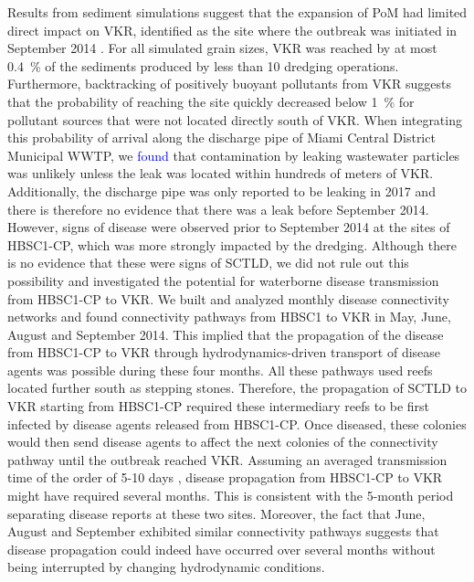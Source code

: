 \documentclass[preprint,12pt,authoryear]{elsarticle}
\newcommand{\modif}[1]{\textcolor{blue}{#1}}
\begin{document}
Results from sediment simulations suggest that the expansion of PoM had limited direct impact on VKR, identified as the site where the outbreak was initiated in September 2014 \citep{precht2016unprecedented}. For all simulated grain sizes, VKR was reached by at most 0.4~\% of the sediments produced by less than 10 dredging operations. Furthermore, backtracking of positively buoyant pollutants from VKR suggests that the probability of reaching the site quickly decreased below 1~\% for pollutant sources that were not located directly south of VKR. When integrating this probability of arrival along the discharge pipe of Miami Central District Municipal WWTP, we \modif{found} that contamination by leaking wastewater particles was unlikely unless the leak was located within hundreds of meters of VKR. Additionally, the discharge pipe was only reported to be leaking in 2017 \citep{staletovich2017} and there is therefore no evidence that there was a leak before September 2014. However, signs of disease were observed prior to September 2014 at the sites of HBSC1-CP, which was more strongly impacted by the dredging. Although there is no evidence that these were signs of SCTLD, we did not rule out this possibility and investigated the potential for waterborne disease transmission from HBSC1-CP to VKR. We built and analyzed monthly disease connectivity networks and found connectivity pathways from HBSC1 to VKR in May, June, August and September 2014. This implied that the propagation of the disease from HBSC1-CP to VKR through hydrodynamics-driven transport of disease agents was possible during these four months. All these pathways used reefs located further south as stepping stones. Therefore, the propagation of SCTLD to VKR starting from HBSC1-CP required these intermediary reefs to be first infected by disease agents released from HBSC1-CP. Once diseased, these colonies would then send disease agents to affect the next colonies of the connectivity pathway until the outbreak reached VKR. Assuming an averaged transmission time of the order of 5-10 days \citep{dobbelaere2020coupled}, disease propagation from HBSC1-CP to VKR might have required several months. This is consistent with the 5-month period separating disease reports at these two sites. Moreover, the fact that June, August and September exhibited similar connectivity pathways suggests that disease propagation could indeed have occurred over several months without being interrupted by changing hydrodynamic conditions.
\end{document}
